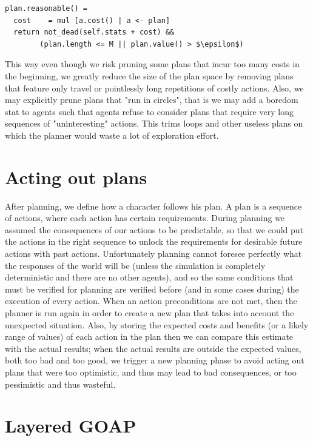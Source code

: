 \begin{lstlisting}
plan.reasonable() =
  cost    = mul [a.cost() | a <- plan]
  return not_dead(self.stats + cost) && 
        (plan.length <= M || plan.value() > $\epsilon$)
\end{lstlisting}

This way even though we risk pruning some plans that incur too many costs in the beginning, we greatly reduce the size of the plan space by removing plans that feature only travel or pointlessly long repetitions of costly actions. Also, we may explicitly prune plans that "run in circles", that is we may add a boredom stat to agents such that agents refuse to consider plans that require very long sequences of "uninteresting" actions. This trims loops and other useless plans on which the planner would waste a lot of exploration effort.


\section{Acting out plans}
\label{sec:enacting_plans}

After planning, we define how a character follows his plan. A plan is a sequence of actions, where each action has certain requirements. During planning we assumed the consequences of our actions to be predictable, so that we could put the actions in the right sequence to unlock the requirements for desirable future actions with past actions. Unfortunately planning cannot foresee perfectly what the responses of the world will be (unless the simulation is completely deterministic and there are no other agents), and so the same conditions that must be verified for planning are verified before (and in some cases during) the execution of every action. When an action preconditions are not met, then the planner is run again in order to create a new plan that takes into account the unexpected situation. Also, by storing the expected costs and benefits (or a likely range of values) of each action in the plan then we can compare this estimate with the actual results; when the actual results are outside the expected values, both too bad and too good, we trigger a new planning phase to avoid acting out plans that were too optimistic, and thus may lead to bad consequences, or too pessimistic and thus wasteful.


\section{Layered GOAP}
\label{sec:layered_goap}

